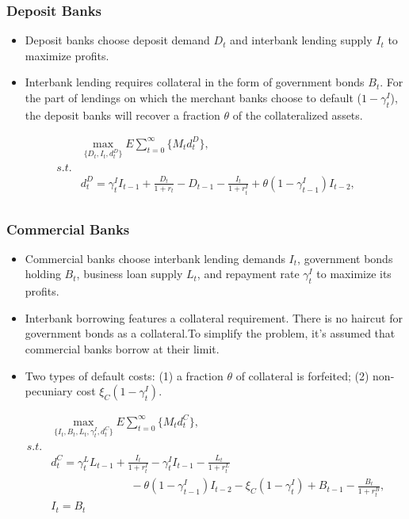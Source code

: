 \documentclass[10pt]{beamer}
\begin{document}
\begin{frame}
\frametitle{Deposit Banks}
  \begin{itemize}
    \item Deposit banks choose deposit demand $D_t$ and interbank lending supply $I_t$ to maximize profits.
    \item Interbank lending requires collateral in the form of government bonds $B_t$. For the part of lendings on which the merchant banks choose to default ($1-\gamma_t^I$), the deposit banks will recover
    a fraction $\theta$ of the collateralized assets. 
  \end{itemize}
  \begin{align}
    &\max_{\{D_t, I_t, d_t^D\}} E \sum_{t=0}^{\infty} \{M_t d_t^D\} ,\\
    s.t. \nonumber \\
    &d_t^D=\gamma_t^I I_{t-1}+\frac{D_t}{1+r_t}-D_{t-1}-\frac{I_t}{1+r_t^I}+ \theta(1-\gamma_{t-1}^I)I_{t-2},\\
  \end{align}
\end{frame}



\begin{frame}
  \frametitle{Commercial Banks}
\begin{itemize}
  \item Commercial banks choose interbank lending demands $I_t$, government bonds holding $B_t$, business loan supply $L_t$, and repayment rate $\gamma_t^I$ to maximize its profits. 
  \item Interbank borrowing features a collateral requirement. There is no haircut for government bonds as a collateral.To simplify the problem, it's assumed that commercial banks borrow at their limit.
  \item Two types of default costs: (1) a fraction $\theta$ of collateral is forfeited; (2) non-pecuniary cost $\xi_C(1-\gamma_t^I)$.
\end{itemize}
\begin{align}
  &\max_{\{I_t, B_t, L_t, \gamma_t^I, d_t^C\}} E \sum_{t=0}^{\infty} \{M_t d_t^C\} ,\\
  s.t. \nonumber \\
  &d_t^C=\gamma_t^L L_{t-1}+\frac{I_t}{1+r_t^I}-\gamma_t^I I_{t-1}-\frac{L_t}{1+r_t^L} \nonumber \\
  & \hspace{3cm}-\theta(1-\gamma_{t-1}^I)I_{t-2}-\xi_C(1-\gamma_t^I)+B_{t-1}-\frac{B_t}{1+r_t^B}, \\
  &I_t= B_t 
\end{align}
\end{frame}
\end{document}
